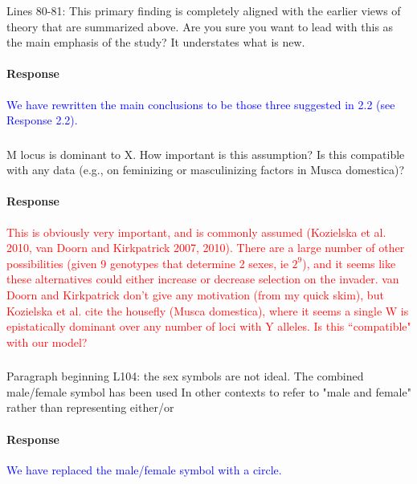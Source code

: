 \documentclass[10pt,letterpaper]{article}
\begin{document}
\noindent\subsubsection{}
Lines 80-81: This primary finding is completely aligned with the earlier views of theory that are summarized above. Are you sure you want to lead with this as the main emphasis of the study? It understates what is new.

\noindent\paragraph{Response}
\textcolor{blue}{We have rewritten the main conclusions to be those three suggested in 2.2 (see Response 2.2).}

\noindent\subsubsection{}
M locus is dominant to X. How important is this assumption? Is this compatible with any data (e.g., on feminizing or masculinizing factors in Musca domestica)?

\noindent\paragraph{Response}
\textcolor{red}{This is obviously very important, and is commonly assumed (Kozielska et al. 2010, van Doorn and Kirkpatrick 2007, 2010). There are a large number of other possibilities (given 9 genotypes that determine 2 sexes, ie $2^9$), and it seems like these alternatives could either increase or decrease selection on the invader. van Doorn and Kirkpatrick don't give any motivation (from my quick skim), but Kozielska et al. cite the housefly (Musca domestica), where it seems a single W is epistatically dominant over any number of loci with Y alleles. Is this ``compatible" with our model?}

\noindent\subsubsection{}
Paragraph beginning L104: the sex symbols are not ideal. The combined male/female symbol has been used In other contexts to refer to "male and female" rather than representing either/or

\noindent\paragraph{Response}
\textcolor{blue}{We have replaced the male/female symbol with a circle.}
\end{document}
